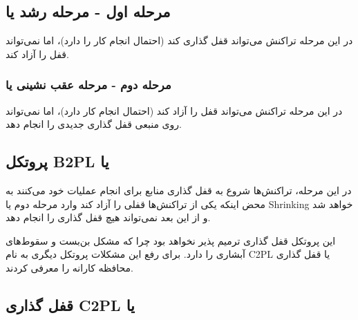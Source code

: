 \documentclass[a4paper]{article}
\begin{document}
\subsection*{مرحله اول - مرحله رشد یا }

در این مرحله تراکنش می‌تواند قفل گذاری کند (احتمال انجام کار را دارد)، اما
نمی‌تواند قفل را آزاد کند.

\subsubsection*{مرحله دوم - مرحله عقب نشینی یا }

در این مرحله تراکنش می‌تواند قفل را آزاد کند (احتمال انجام کار دارد)، اما
نمی‌تواند روی منبعی قفل گذاری جدیدی را انجام دهد.

\newpage

\subsection{پروتکل B2PL یا }

در این مرحله، تراکنش‌ها شروع به قفل گذاری منابع برای انجام عملیات خود می‌کنند به
محض اینکه یکی از تراکنش‌ها قفلی را آزاد کند وارد مرحله دوم یا Shrinking خواهد شد
و از این بعد نمی‌تواند هیچ قفل گذاری را انجام دهد.


\begin{LTR}
    \begin{table}[h]
        \begin{RTL}
            \caption{زمانبندی $S_{6}$}
        \end{RTL}
        \centering
    \end{table}
\end{LTR}

این پروتکل قفل گذاری ترمیم پذیر نخواهد بود چرا که مشکل بن‌بست و سقوط‌های آبشاری
را دارد. برای رفع این مشکلات پروتکل دیگری به نام C2PL یا قفل گذاری محافظه کارانه
را معرفی کردند.

\subsection{قفل گذاری C2PL یا }
\end{document}
